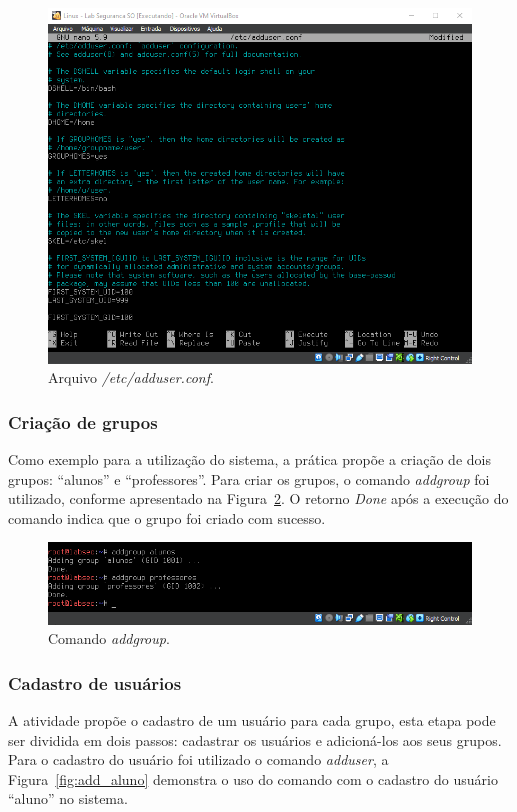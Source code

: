 \documentclass[
  12pt,				%
  oneside,   	        %
  a4paper,			%
  english,			%
  french,				%
  spanish,			%
  brazil,				%
  ]{pacotes/abntex2}
\begin{document}
\begin{figure}[H]
  \centering
  \includegraphics[scale=0.7]{figuras/nano_adduser.png}
  \caption{Arquivo \textit{/etc/adduser.conf}.}
  \label{fig:adduser}
\end{figure}

\subsubsection{Criação de grupos}
Como exemplo para a utilização do sistema, a prática propõe a criação de dois grupos: ``alunos'' e ``professores''. Para criar os grupos, o comando \textit{addgroup} foi utilizado, conforme apresentado na Figura~\ref{fig:addgroup}. O retorno \textit{Done} após a execução do comando indica que o grupo foi criado com sucesso.

\begin{figure}[H]
  \centering
  \includegraphics[scale=0.7]{figuras/addgroups.png}
  \caption{Comando \textit{addgroup}.}
  \label{fig:addgroup}
\end{figure}

\subsubsection{Cadastro de usuários}
A atividade propõe o cadastro de um usuário para cada grupo, esta etapa pode ser dividida em dois passos: cadastrar os usuários e adicioná-los aos seus grupos. Para o cadastro do usuário foi utilizado o comando \textit{adduser}, a Figura~\ref{fig:add_aluno} demonstra o uso do comando com o cadastro do usuário ``aluno'' no sistema.
\end{document}
